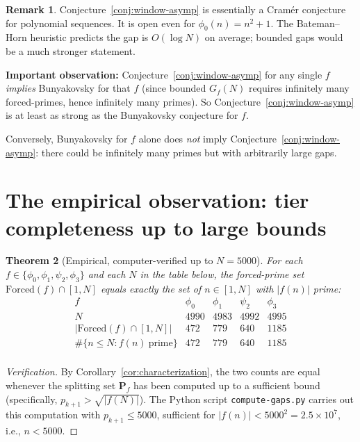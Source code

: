 \documentclass[11pt]{article}
\newtheorem{theorem}{Theorem}[section]
\theoremstyle{definition}
\newtheorem{remark}[theorem]{Remark}
\newcommand{\PP}{\mathbf{P}}
\newcommand{\Forced}{\mathrm{Forced}}
\begin{document}
\begin{remark}
Conjecture~\ref{conj:window-asymp} is essentially a Cram\'er conjecture for polynomial sequences. It is open even for $\phi_0(n) = n^2+1$. The Bateman--Horn heuristic predicts the gap is $O(\log N)$ on average; bounded gaps would be a much stronger statement.

\textbf{Important observation:} Conjecture~\ref{conj:window-asymp} for any single $f$ \emph{implies} Bunyakovsky for that $f$ (since bounded $G_f(N)$ requires infinitely many forced-primes, hence infinitely many primes). So Conjecture~\ref{conj:window-asymp} is at least as strong as the Bunyakovsky conjecture for $f$.

Conversely, Bunyakovsky for $f$ alone does \emph{not} imply Conjecture~\ref{conj:window-asymp}: there could be infinitely many primes but with arbitrarily large gaps.
\end{remark}

\section{The empirical observation: tier completeness up to large bounds}\label{sec:empirical}

\begin{theorem}[Empirical, computer-verified up to $N = 5000$]\label{thm:empirical-completeness}
For each $f \in \{\phi_0, \phi_1, \psi_2, \phi_3\}$ and each $N$ in the table below, the forced-prime set $\Forced(f) \cap [1, N]$ equals \emph{exactly} the set of $n \in [1, N]$ with $|f(n)|$ prime:
\[
\begin{array}{l|cccc}
f & \phi_0 & \phi_1 & \psi_2 & \phi_3 \\
\hline
N & 4990 & 4983 & 4992 & 4995 \\
|\Forced(f) \cap [1,N]| & 472 & 779 & 640 & 1185 \\
\#\{n \le N : f(n)\ \text{prime}\} & 472 & 779 & 640 & 1185 \\
\end{array}
\]
\end{theorem}

\begin{proof}[Verification]
By Corollary~\ref{cor:characterization}, the two counts are equal whenever the splitting set $\PP_f$ has been computed up to a sufficient bound (specifically, $p_{k+1} > \sqrt{|f(N)|}$). The Python script \texttt{compute-gaps.py} carries out this computation with $p_{k+1} \le 5000$, sufficient for $|f(n)| < 5000^2 = 2.5 \times 10^7$, i.e., $n < 5000$.
\end{proof}
\end{document}
